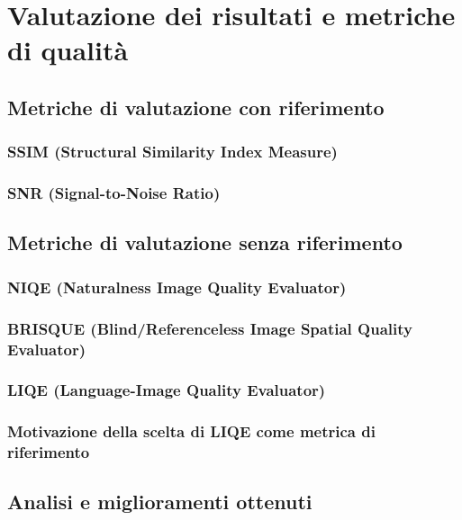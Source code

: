 \chapter{Valutazione dei risultati e metriche di qualità} \label{chap:evaluation}

\section{Metriche di valutazione con riferimento} \label{sec:r_metrics}

\subsection{SSIM (Structural Similarity Index Measure)} \label{subsec:ssim}

\subsection{SNR (Signal-to-Noise Ratio)} \label{subsec:snr}

\section{Metriche di valutazione senza riferimento} \label{sec:nr_metrics}

\subsection{NIQE (Naturalness Image Quality Evaluator)} \label{subsec:niqe}

\subsection{BRISQUE (Blind/Referenceless Image Spatial Quality Evaluator)} \label{subsec:brisque}

\subsection{LIQE (Language-Image Quality Evaluator)} \label{subsec:liqe}

\subsection{Motivazione della scelta di LIQE come metrica di riferimento} \label{subsec:why_liqe}

\section{Analisi e miglioramenti ottenuti} \label{sec:analysis}

